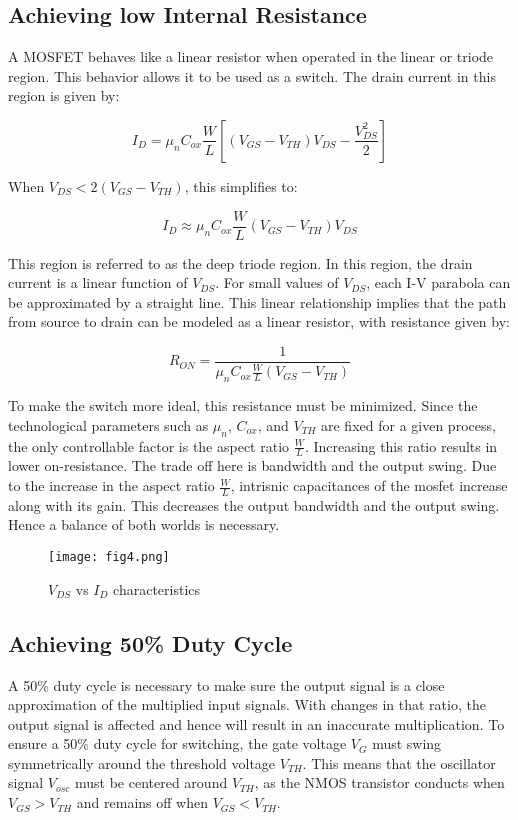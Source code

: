 \documentclass[conference]{IEEEtran}
\begin{document}
\subsection{Achieving low Internal Resistance}

A MOSFET behaves like a linear resistor when operated in the linear or triode region. This behavior allows it to be used as a switch. The drain current in this region is given by:

\[
I_D = \mu_n C_{ox} \frac{W}{L} \left[(V_{GS} - V_{TH})V_{DS} - \frac{V_{DS}^2}{2} \right]
\]

When \( V_{DS} <  2(V_{GS} - V_{TH}) \), this simplifies to:

\[
I_D \approx \mu_n C_{ox} \frac{W}{L}(V_{GS} - V_{TH})V_{DS}
\]

This region is referred to as the deep triode region. In this region, the drain current is a linear function of \( V_{DS} \). For small values of \( V_{DS} \), each I-V parabola can be approximated by a straight line. This linear relationship implies that the path from source to drain can be modeled as a linear resistor, with resistance given by:

\[
R_{ON} = \frac{1}{\mu_n C_{ox} \frac{W}{L}(V_{GS} - V_{TH})}
\]

To make the switch more ideal, this resistance must be minimized. Since the technological parameters such as \( \mu_n \), \( C_{ox} \), and \( V_{TH} \) are fixed for a given process, the only controllable factor is the aspect ratio \( \frac{W}{L} \). Increasing this ratio results in lower on-resistance. The trade off here is bandwidth and the output swing. Due to the increase in the aspect ratio \( \frac{W}{L} \), intrisnic capacitances of the mosfet increase along with its gain. This decreases the output bandwidth and the output swing. Hence a balance of both worlds is necessary.

\begin{figure}[htbp]
    \centering
    \texttt{[image: fig4.png]}
    \caption{$V_{DS}$ vs $I_{D}$ characteristics}
\end{figure}

\subsection{Achieving 50\% Duty Cycle}
A 50\% duty cycle is necessary to make sure the output signal is a close approximation of the multiplied input signals. With changes in that ratio, the output signal is affected and hence will result in an inaccurate multiplication.
To ensure a 50\% duty cycle for switching, the gate voltage \( V_G \) must swing symmetrically around the threshold voltage \( V_{TH} \). This means that the oscillator signal \( V_{osc} \) must be centered around \( V_{TH} \), as the NMOS transistor conducts when \( V_{GS} > V_{TH} \) and remains off when \( V_{GS} < V_{TH} \).
\end{document}
